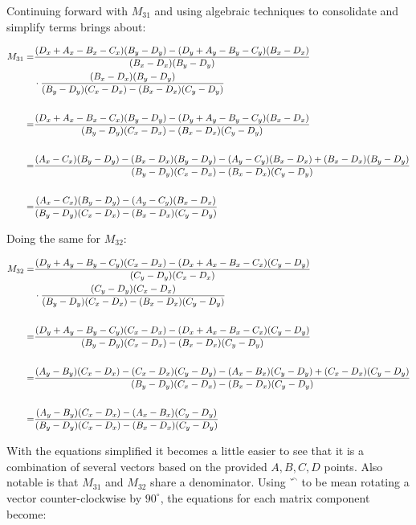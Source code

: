 \documentclass[letterpaper, 11pt]{article}
\begin{document}
 Continuing forward with \(M_{31}\) and using algebraic techniques to consolidate and simplify terms brings about:

\begin{align}
M_{31} =& \frac{(D_x + A_x - B_x - C_x)(B_y - D_y) - (D_y + A_y - B_y - C_y)(B_x - D_x)}{(B_x - D_x)(B_y - D_y)} \\
&\cdot \frac{(B_x - D_x)(B_y - D_y)}{(B_y - D_y)(C_x - D_x) - (B_x - D_x)(C_y - D_y)} \\ \\
=& \frac{(D_x + A_x - B_x - C_x)(B_y - D_y) - (D_y + A_y - B_y - C_y)(B_x - D_x)}{(B_y - D_y)(C_x - D_x) - (B_x - D_x)(C_y - D_y)} \\ \\
=& { \scriptsize \frac{(A_x - C_x)(B_y - D_y) - (B_x - D_x)(B_y - D_y) - (A_y - C_y)(B_x - D_x) + (B_x - D_x)(B_y - D_y)}{(B_y - D_y)(C_x - D_x) - (B_x - D_x)(C_y - D_y)} } \\ \\
=& \frac{(A_x - C_x)(B_y - D_y) - (A_y - C_y)(B_x - D_x)}{(B_y - D_y)(C_x - D_x) - (B_x - D_x)(C_y - D_y)}
\end{align}

Doing the same for \(M_{32}\):

\begin{align}
M_{32} =& \frac{(D_y + A_y - B_y - C_y)(C_x - D_x) - (D_x + A_x - B_x - C_x)(C_y - D_y)}{(C_y - D_y)(C_x - D_x)} \\
&\cdot \frac{(C_y - D_y)(C_x - D_x)}{(B_y - D_y)(C_x - D_x) - (B_x - D_x)(C_y - D_y)} \\ \\
=& \frac{(D_y + A_y - B_y - C_y)(C_x - D_x) - (D_x + A_x - B_x - C_x)(C_y - D_y)}{(B_y - D_y)(C_x - D_x) - (B_x - D_x)(C_y - D_y)} \\ \\
=& {\scriptsize \frac{(A_y - B_y)(C_x - D_x) - (C_x - D_x)(C_y - D_y) - (A_x - B_x)(C_y - D_y) + (C_x - D_x)(C_y - D_y)}{(B_y - D_y)(C_x - D_x) - (B_x - D_x)(C_y - D_y)} } \\ \\
=& \frac{(A_y - B_y)(C_x - D_x) - (A_x - B_x)(C_y - D_y)}{(B_y - D_y)(C_x - D_x) - (B_x - D_x)(C_y - D_y)}
\end{align}

With the equations simplified it becomes a little easier
to see that it is a combination of several vectors based
on the provided \(A, B, C, D\) points. Also notable is that \(M_{31}\) and \(M_{32}\) share a denominator. Using \(^{\curvearrowleft}\) to be mean rotating a vector counter-clockwise by \(90^{\circ}\), the equations for each matrix component become:
\end{document}
